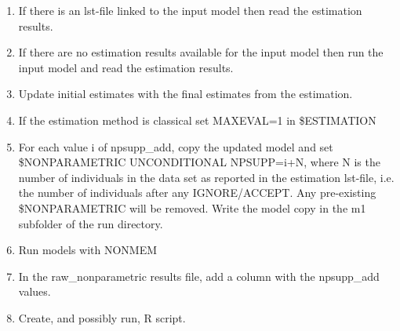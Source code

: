 \begin{enumerate}
\item If there is an lst-file linked to the input model then read the estimation results. %
\item If there are no estimation results available for the input model then run the input model and read the estimation results.

\item Update initial estimates with the final estimates from the estimation.

\item If the estimation method is classical set MAXEVAL=1 in \$ESTIMATION 

\item For each value i of npsupp\_add, copy the updated model and set \$NONPARAMETRIC UNCONDITIONAL NPSUPP=i+N,
where N is the number of individuals in the data set as reported in the estimation lst-file, i.e. the number
of individuals after any IGNORE/ACCEPT. Any pre-existing \$NONPARAMETRIC will be removed.
Write the model copy in the m1 subfolder of the run directory.
\item Run models with NONMEM
\item In the raw\_nonparametric results file, add a column with the npsupp\_add values. %
\item Create, and possibly run, R script. 
\end{enumerate}



